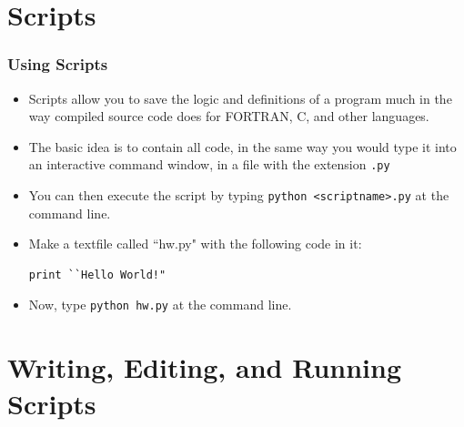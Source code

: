 \documentclass{beamer}
\begin{document}
\section[]{Scripts}
\begin{frame}[fragile]
\frametitle{Using Scripts}
\begin{itemize}
\item Scripts allow you to save the logic and definitions of a program much in the
 way compiled source code does for FORTRAN, C, and other languages.
\item The basic idea is to contain all code, in the same way you would type it into an interactive 
command window, in a file with the extension \texttt{.py}
\item You can then execute the script by typing \newline{} \texttt{python <scriptname>.py} \newline{}at the command line.
\pause
\item Make a textfile called ``hw.py" with the following code in it:
\begin{lstlisting}
print ``Hello World!"
\end{lstlisting}
\item Now, type \texttt{python hw.py} at the command line.
\end{itemize}
\end{frame}

\section[]{Writing, Editing, and Running Scripts}
\end{document}
